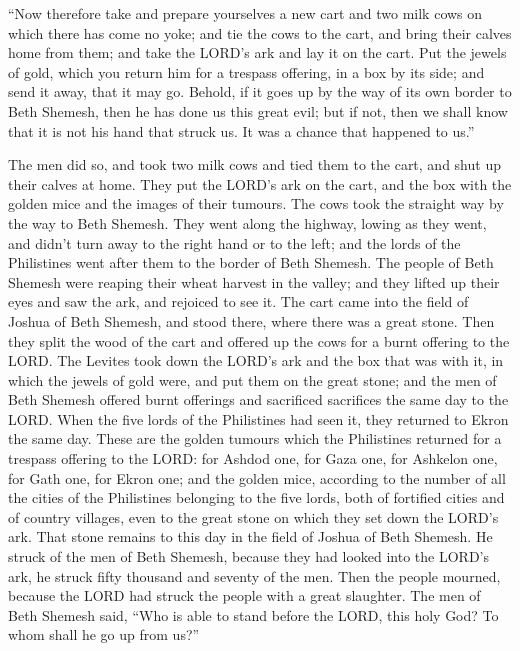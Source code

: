  ``Now therefore take and prepare yourselves a new cart and
two milk cows on which there has come no yoke; and tie the cows to the
cart, and bring their calves home from them;  and take the
LORD's ark and lay it on the cart. Put the jewels of gold, which you
return him for a trespass offering, in a box by its side; and send it
away, that it may go.  Behold, if it goes up by the way of
its own border to Beth Shemesh, then he has done us this great evil; but
if not, then we shall know that it is not his hand that struck us. It
was a chance that happened to us.''

 The men did so, and took two milk cows and tied them to
the cart, and shut up their calves at home.  They put the
LORD's ark on the cart, and the box with the golden mice and the images
of their tumours.  The cows took the straight way by the
way to Beth Shemesh. They went along the highway, lowing as they went,
and didn't turn away to the right hand or to the left; and the lords of
the Philistines went after them to the border of Beth Shemesh.
 The people of Beth Shemesh were reaping their wheat
harvest in the valley; and they lifted up their eyes and saw the ark,
and rejoiced to see it.  The cart came into the field of
Joshua of Beth Shemesh, and stood there, where there was a great stone.
Then they split the wood of the cart and offered up the cows for a burnt
offering to the LORD.  The Levites took down the LORD's ark
and the box that was with it, in which the jewels of gold were, and put
them on the great stone; and the men of Beth Shemesh offered burnt
offerings and sacrificed sacrifices the same day to the LORD.
 When the five lords of the Philistines had seen it, they
returned to Ekron the same day.  These are the golden
tumours which the Philistines returned for a trespass offering to the
LORD: for Ashdod one, for Gaza one, for Ashkelon one, for Gath one, for
Ekron one;  and the golden mice, according to the number of
all the cities of the Philistines belonging to the five lords, both of
fortified cities and of country villages, even to the great stone on
which they set down the LORD's ark. That stone remains to this day in
the field of Joshua of Beth Shemesh.  He struck of the men
of Beth Shemesh, because they had looked into the LORD's ark, he struck
fifty thousand and seventy of the men. Then the people mourned, because
the LORD had struck the people with a great slaughter.  The
men of Beth Shemesh said, ``Who is able to stand before the LORD, this
holy God? To whom shall he go up from us?''

